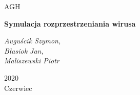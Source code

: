 \documentclass[a4paper,12pt]{article}
\begin{document}
\begin{titlepage}
	\centering
	{\scshape\LARGE AGH \par}
	\vspace{1cm}
	{\scshape\Large \par}
	\vspace{1.5cm}
	{\huge\bfseries Symulacja rozprzestrzeniania wirusa\par}
	\vspace{2cm}
	{\Large\itshape Auguścik Szymon,\\ Błasiok Jan, \\ Maliszewski Piotr\par}
	\vfill
	
	{\large 2020\\Czerwiec\par}
\end{titlepage}

	
\end{document}
